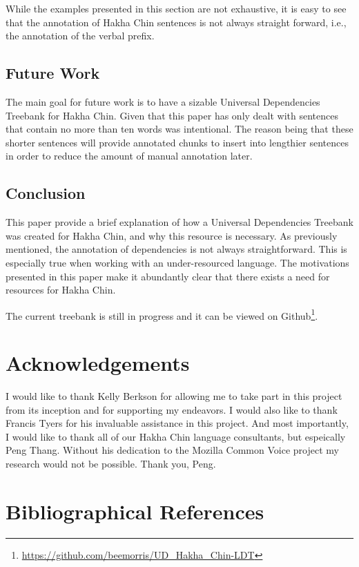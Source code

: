 \documentclass[10pt, a4paper]{article}
\begin{document}
While the examples presented in this section are not exhaustive, it is easy to see that the annotation of Hakha Chin sentences is not always straight forward, i.e., the annotation of the verbal prefix. 

\subsection{Future Work}
\label{sec:future}
The main goal for future work is to have a sizable Universal Dependencies Treebank for Hakha Chin. Given that this paper has only dealt with sentences that contain no more than ten words was intentional. The reason being that these shorter sentences will provide annotated chunks to insert into lengthier sentences in order to reduce the amount of manual annotation later. 

\subsection{Conclusion}
\label{sect:conclusion}
This paper provide a brief explanation of how a Universal Dependencies Treebank was created for Hakha Chin, and why this resource is necessary. As previously mentioned, the annotation of dependencies is not always straightforward. This is especially true when working with an under-resourced language. The motivations presented in this paper make it abundantly clear that there exists a need for resources for Hakha Chin. 

The current treebank is still in progress and it can be viewed on Github\footnote{\url{https://github.com/beemorris/UD_Hakha_Chin-LDT}}.

\section{Acknowledgements}
I would like to thank Kelly Berkson for allowing me to take part in this project from its inception and for supporting my endeavors. I would also like to thank Francis Tyers for his invaluable assistance in this project. And most importantly, I would like to thank all of our Hakha Chin language consultants, but espeically Peng Thang. Without his dedication to the Mozilla Common Voice project my research would not be possible. Thank you, Peng. 

\nocite{*}
\section{Bibliographical References}
\label{main:ref}






\end{document}
